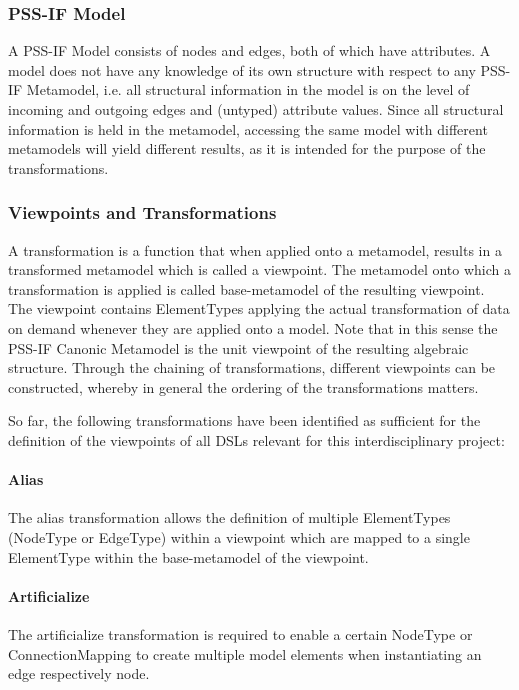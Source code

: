 \subsubsection{PSS-IF Model}

A PSS-IF Model consists of nodes and edges, both of which have attributes. A model does not have any knowledge of its own structure with respect to any PSS-IF Metamodel, i.e. all structural information in the model is on the level of incoming and outgoing edges and (untyped) attribute values. Since all structural information is held in the metamodel, accessing the same model with different metamodels will yield different results, as it is intended for the purpose of the transformations.

\subsubsection{Viewpoints and Transformations}

A transformation is a function that when applied onto a metamodel, results in a transformed metamodel which is called a viewpoint. The metamodel onto which a transformation is applied is called base-metamodel of the resulting viewpoint. The viewpoint contains ElementTypes applying the actual transformation of data on demand whenever they are applied onto a model. Note that in this sense the PSS-IF Canonic Metamodel is the unit viewpoint of the resulting algebraic structure. Through the chaining of transformations, different viewpoints can be constructed, whereby in general the ordering of the transformations matters. 

So far, the following transformations have been identified as sufficient for the definition of the viewpoints of all DSLs relevant for this interdisciplinary project:

\paragraph{Alias} The alias transformation allows the definition of multiple ElementTypes (NodeType or EdgeType) within a viewpoint which are mapped to a single ElementType within the base-metamodel of the viewpoint.

\paragraph{Artificialize} The artificialize transformation is required to enable a certain NodeType or ConnectionMapping to create multiple model elements when instantiating an edge respectively node.

